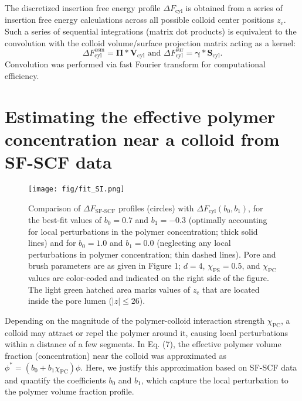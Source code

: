 \documentclass[10pt, a4paper, twocolumn]{article}
\begin{document}
The discretized insertion free energy profile $\Delta F_{\text{cyl}}$ is obtained from a series of insertion free energy calculations across all possible colloid center positions $z_{\text{c}}$.
Such a series of sequential integrations (matrix dot products) is equivalent to the convolution with the colloid volume/surface projection matrix acting as a kernel:
\begin{equation*}
    \Delta F_{\text{cyl}}^{\text{osm}} = \boldsymbol{\Pi} \ast \bm{V}_{\text{cyl}} \text{ and }
    \Delta F_{\text{cyl}}^{\text{sur}} = \boldsymbol{\gamma} \ast \bm{S}_{\text{cyl}}.
\end{equation*}
Convolution was performed via fast Fourier transform for computational efficiency.




\section{Estimating the effective polymer concentration near a colloid from SF-SCF data}

\begin{figure}[]
    \centering
    \texttt{[image: fig/fit\_SI.png]}
    \caption{
    Comparison of $\Delta F_{\text{SF-SCF}}$ profiles (circles) with $\Delta F_{\text{cyl}}(b_0,b_1)$, for the best-fit values of $b_0 = 0.7$ and $b_1 = -0.3$ (optimally accounting for local perturbations in the polymer concentration; thick solid lines) and for $b_0 = 1.0$ and $b_1 = 0.0$ (neglecting any local perturbations in polymer concentration; thin dashed lines).
    Pore and brush parameters are as given in Figure 1; $d = 4$, $\chi_{\text{PS}} = 0.5$, and $\chi_{\text{PC}}$ values are color-coded and indicated on the right side of the figure.
    The light green hatched area marks values of $z_{\text{c}}$ that are located inside the pore lumen ($|z| \leq 26$).
    }
    \label{fig:fit_SI}
\end{figure}

Depending on the magnitude of the polymer-colloid interaction strength $\chi_{\text{PC}}$, a colloid may attract or repel the polymer around it, causing local perturbations within a distance of a few segments.
In Eq. (7), the effective polymer volume fraction (concentration) near the colloid was approximated as $\phi^{\ast} = (b_0 + b_1 \chi_{\text{PC}}) \phi$.
Here, we justify this approximation based on SF-SCF data and quantify the coefficients $b_0$ and $b_1$, which capture the local perturbation to the polymer volume fraction profile.
\end{document}
